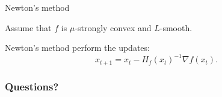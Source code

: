 \documentclass{beamer}
\begin{document}
\begin{frame}[t]{Newton's method}
	\grid

	\vspace{-0.2cm}
	Assume that $f$ is $\mu$-strongly convex and $L$-smooth.
		\vspace{-0.3cm}
	\begin{exampleblock}{}
		Newton's method perform the updates:
		$$
		x_{t+1} = x_t - H_f(x_t)^{-1} \nabla f(x_t).
		$$
	\end{exampleblock}
\end{frame}



\appendix
\backupbegin
\begin{frame}[t]
	\frametitle{Questions?}
	\grid

	\pause
\end{frame}
\backupend
\end{document}
